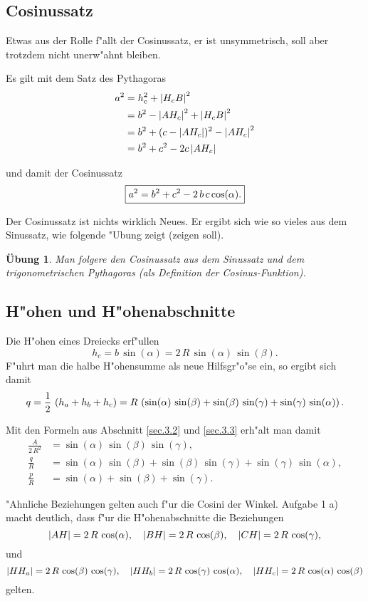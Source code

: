 \documentclass[11pt,a4paper]{article}
\newtheorem{uebung}{\"{U}bung}
\begin{document}
\subsection{Cosinussatz}
Etwas aus der Rolle f"allt der Cosinussatz, er ist unsymmetrisch, soll aber
trotzdem nicht unerw"ahnt bleiben.

\parbox{6cm}{}\hfill\parbox{6cm}{
Es gilt mit dem Satz des Pythagoras
\begin{align*}
  a^2&=h_c^2+\left\vert {\mathnormal{H_cB}}\right\vert^2\\
  &=b^2-\left\vert {\mathnormal{AH_c}}\right\vert^2+\left\vert {\mathnormal{H_cB}}\right\vert^2\\
  &=b^2+(c-\left\vert {\mathnormal{AH_c}}\right\vert)^2-\left\vert {\mathnormal{AH_c}}\right\vert^2\\
  &=b^2+c^2-2c\left\vert {\mathnormal{AH_c}}\right\vert
\end{align*}}

und damit der Cosinussatz
\[\framebox{$\displaystyle a^2=b^2+c^2-2\,b\,c\cos(\alpha)$.}\]

Der Cosinussatz ist nichts wirklich Neues. Er ergibt sich wie so vieles aus
dem Sinussatz, wie folgende "Ubung zeigt (zeigen soll).

\begin{uebung}
  Man folgere den Cosinussatz aus dem Sinussatz und dem trigonometrischen
  Pythagoras (als {\glqq}Definition{\grqq} der Cosinus-Funktion).
\end{uebung}

\subsection{H"ohen und H"ohenabschnitte}

Die H"ohen eines Dreiecks erf"ullen 
\[ h_c=b\,\sin(\alpha)=2\,R\,\sin(\alpha)\,\sin(\beta). \]
F"uhrt man die halbe H"ohensumme als neue Hilfsgr"o"se ein, so ergibt sich
damit
\[q =\frac12\,\left(h_a+h_b+h_c\right) =R\,\left(\sin(\alpha)\,\sin(\beta)
  +\sin(\beta)\,\sin(\gamma) +\sin(\gamma)\,\sin(\alpha)\right). \] 

Mit den Formeln aus Abschnitt \ref{sec.3.2} und \ref{sec.3.3} erh"alt man
damit
\begin{align*}
   \frac{A}{2\,R^2}&=\sin(\alpha)\,\sin(\beta)\,\sin(\gamma),\\
   \frac{q}{R}&=\sin(\alpha)\,\sin(\beta)+\sin(\beta)\,\sin(\gamma)
   +\sin(\gamma)\,\sin(\alpha),\\ 
   \frac{p}{R}&=\sin(\alpha)+\sin(\beta)+\sin(\gamma).   
\end{align*}

"Ahnliche Beziehungen gelten auch f"ur die Cosini der Winkel.  Aufgabe 1 a)
macht deutlich, dass f"ur die H"ohenabschnitte die Beziehungen
\[ \left\vert {\mathnormal{AH}}\right\vert=2\,R\,\cos(\alpha),\quad
   \left\vert {\mathnormal{BH}}\right\vert=2\,R\,\cos(\beta),\quad
   \left\vert {\mathnormal{CH}}\right\vert=2\,R\,\cos(\gamma),\]
und 
\[ \left\vert {\mathnormal{HH_a}}\right\vert=2\,R\,\cos(\beta)\,\cos(\gamma),\quad
   \left\vert {\mathnormal{HH_b}}\right\vert=2\,R\,\cos(\gamma)\,\cos(\alpha),\quad
   \left\vert {\mathnormal{HH_c}}\right\vert=2\,R\,\cos(\alpha)\,\cos(\beta)
\]
gelten.
\end{document}
